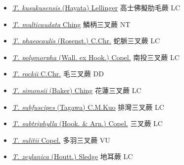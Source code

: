 \begin{itemize}
\begin{itemize}
        \item[] \href{http://www.theplantlist.org/tpl1.1/search?q=Tectaria+kusukusensis}{\textit{T. kusukusensis} (Hayata) Lellinger}   高士佛擬肋毛蕨   LC
        \item[] \href{http://www.theplantlist.org/tpl1.1/search?q=Tectaria+multicaudata}{\textit{T. multicaudata} Ching}   鱗柄三叉蕨   NT
        \item[] \href{http://www.theplantlist.org/tpl1.1/search?q=Tectaria+phaeocaulis}{\textit{T. phaeocaulis} (Rosenst.) C.Chr.}   蛇脈三叉蕨   LC
        \item[] \href{http://www.theplantlist.org/tpl1.1/search?q=Tectaria+polymorpha}{\textit{T. polymorpha} (Wall. ex Hook.) Copel.}   南投三叉蕨   LC
        \item[] \href{http://www.theplantlist.org/tpl1.1/search?q=Tectaria+rockii}{\textit{T. rockii} C.Chr.}   毛三叉蕨   DD
        \item[] \href{http://www.theplantlist.org/tpl1.1/search?q=Tectaria+simonsii}{\textit{T. simonsii} (Baker) Ching}   花蓮三叉蕨   LC
        \item[] \href{http://www.theplantlist.org/tpl1.1/search?q=Tectaria+subfuscipes}{\textit{T. subfuscipes} (Tagawa) C.M.Kuo}   排灣三叉蕨   LC
        \item[] \href{http://www.theplantlist.org/tpl1.1/search?q=Tectaria+subtriphylla}{\textit{T. subtriphylla} (Hook. \& Arn.) Copel.}   三叉蕨   LC
        \item[] \href{http://www.theplantlist.org/tpl1.1/search?q=Tectaria+sulitii}{\textit{T. sulitii} Copel.}   多羽三叉蕨   VU
        \item[] \href{http://www.theplantlist.org/tpl1.1/search?q=Tectaria+zeylanica}{\textit{T. zeylanica} (Houtt.) Sledge}   地耳蕨   LC
  \end{itemize}
  \end{itemize}
